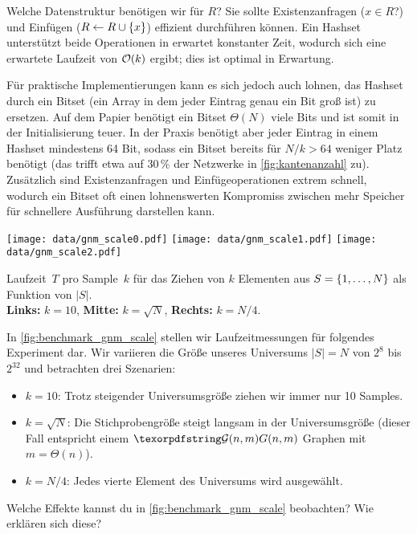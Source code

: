 Welche Datenstruktur benötigen wir für $R$? Sie sollte Existenzanfragen ($x \in R$?) und Einfügen ($R \gets R \cup \left\{x\right\}$) effizient durchführen können.
Ein Hashset unterstützt beide Operationen in erwartet konstanter Zeit, wodurch sich eine erwartete Laufzeit von $\mathcal{O}\!\left(k\right)$ ergibt; dies ist optimal in Erwartung.

Für praktische Implementierungen kann es sich jedoch auch lohnen, das Hashset durch ein Bitset (\dh ein Array in dem jeder Eintrag genau ein Bit groß ist) zu ersetzen.
Auf dem Papier benötigt ein Bitset $\Theta(N)$ viele Bits und ist somit in der Initialisierung teuer.
In der Praxis benötigt aber jeder Eintrag in einem Hashset mindestens 64 Bit, sodass ein Bitset bereits für $N / k > 64$ weniger Platz benötigt (das trifft etwa auf 30\,\% der Netzwerke in \cref{fig:kantenanzahl} zu).
Zusätzlich sind Existenzanfragen und Einfügeoperationen extrem schnell, wodurch ein Bitset oft einen lohnenswerten Kompromiss zwischen mehr Speicher für schnellere Ausführung darstellen kann.

\begin{widefigure}
    \texttt{[image: data/gnm\_scale0.pdf]}\hfill
    \texttt{[image: data/gnm\_scale1.pdf]}\hfill
    \texttt{[image: data/gnm\_scale2.pdf]}

    \caption{
        Laufzeit~$T$ pro Sample~$k$ für das Ziehen von $k$ Elementen aus $S = \left\{1, \ldots, N\right\}$ als Funktion von $|S|$.\\
        \textbf{Links:} $k=10$, \textbf{Mitte: } $k = \sqrt{N}$, \textbf{Rechts: } $k = N / 4$.
    }
    \label{fig:benchmark_gnm_scale}
\end{widefigure}

In \cref{fig:benchmark_gnm_scale} stellen wir Laufzeitmessungen für folgendes Experiment dar.
Wir variieren die Größe unseres Universums $|S| = N$ von $2^8$ bis $2^{32}$ und betrachten drei Szenarien:
\begin{itemize}
    \item $k=10$: Trotz steigender Universumsgröße ziehen wir immer nur 10 Samples.
    \item $k=\sqrt{N}$: Die Stichprobengröße steigt langsam in der Universumsgröße (dieser Fall entspricht einem $\Gnm$ Graphen mit $m = \Theta(n)$).
    \item $k=N/4$: Jedes vierte Element des Universums wird ausgewählt.
\end{itemize}

\begin{exercise}
    Welche Effekte kannst du in \cref{fig:benchmark_gnm_scale} beobachten? Wie erklären sich diese?
\end{exercise}

